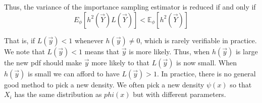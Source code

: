 \documentclass[12pt]{article}
\newlength\tindent
\renewcommand{\indent}{\hspace*{\tindent}}
\begin{document}
Thus, the variance of the importance sampling estimator is reduced if and only if
\begin{equation*}
	E_{\phi}[h^2(\vec{Y})L(\vec{Y})] < \mathbb E_{\phi}[h^2(\vec{Y})]
\end{equation*}

\indent That is, if $L(\vec{y}) < 1$ whenever $h(\vec{y}) \neq 0$, which is rarely verifiable in practice. We note that $L(\vec{y}) < 1$ means that $\vec{y}$ is more likely. Thus, when $h(\vec{y})$ is large the new pdf should make $\vec{y}$ more likely to that $L(\vec{y})$ is now small. When $h(\vec{y})$ is small we can afford to have $L(\vec{y}) > 1$. In practice, there is no general good method to pick a new density. We often pick a new density $\psi(x)$ so that $X_i$ has the same distribution as $phi(x)$ but with different parameters.
\end{document}
